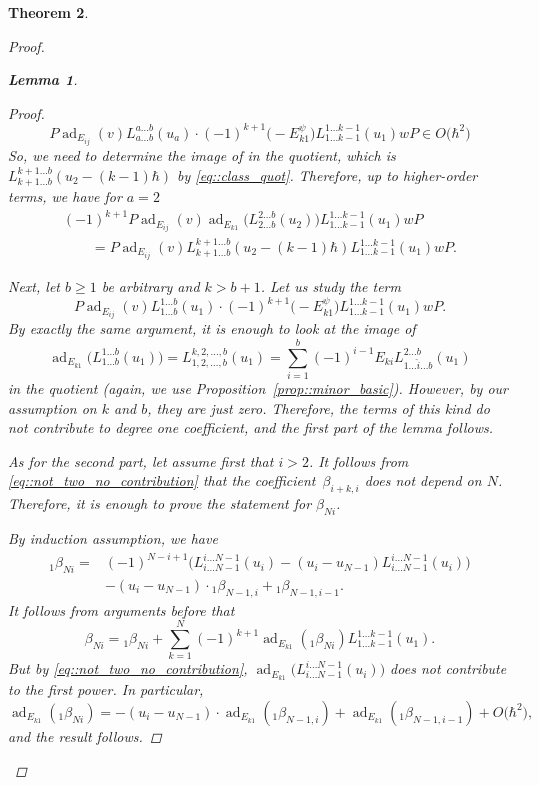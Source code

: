 \documentclass[10pt,a4paper]{article}
\numberwithin{equation}{section}
\newtheorem{Theorem}{Theorem}[section]
\newtheorem{Lemma}[Theorem]{Lemma}
\DeclareMathOperator{\ad}{ad}
\begin{document}
\begin{Theorem}
\begin{proof}
\begin{Lemma}
\begin{proof}
\begin{equation}
						P\ad_{E_{ij}}(v) L_{a\dots b}^{a\dots b}(u_a) \cdot (-1)^{k+1} \bigl(-E_{k1}^{\psi}\bigr) L_{1\dots k-1}^{1\dots k-1}(u_1) wP \in O\bigl(\hbar^2\bigr)
					\end{equation}
					So, we need to determine the image of  in the quotient, which is $L_{k+1\dots b}^{k+1\dots b}(u_2 - (k-1)\hbar)$ by \eqref{eq::class_quot}. Therefore, up to higher-order terms, we have for $a=2$
					\begin{gather*}
						(-1)^{k+1}P\ad_{E_{ij}}(v)\ad_{E_{k1}}\bigl(L_{2\dots b}^{2\dots b}(u_2)\bigr) L_{1\dots k-1}^{1\dots k-1}(u_1)w P \\
						\qquad=P\ad_{E_{ij}}(v) L_{k+1\dots b}^{k+1\dots b}(u_2-(k-1)\hbar) L_{1\dots k-1}^{1\dots k-1}(u_1) wP.
					\end{gather*}
					
					Next, let $b\geq 1$ be arbitrary and $k>b+1$. Let us study the term
					\[
					P\ad_{E_{ij}}(v) L_{1 \dots b}^{1\dots b}(u_1) \cdot (-1)^{k+1} \bigl(-E_{k1}^{\psi}\bigr) L_{1\dots k-1}^{1\dots k-1}(u_1) wP.
					\]
					By exactly the same argument, it is enough to look at the image of
					\[
					\ad_{E_{k1}}\bigl(L_{1\dots b}^{1\dots b}(u_1)\bigr) = L_{1,2,\dots,b}^{k,2,\dots,b}(u_1) = \sum\limits_{i=1}^b (-1)^{i-1} E_{ki} L_{1\dots \hat{i} \dots b}^{2\dots b}(u_1)
					\]
					in the quotient (again, we use Proposition~\ref{prop::minor_basic}). However, by our assumption on $k$ and $b$, they are just zero. Therefore, the terms of this kind do not contribute to degree one coefficient, and the first part of the lemma follows.
					
					As for the second part, let assume first that $i>2$. It follows from \eqref{eq::not_two_no_contribution} that the coefficient~$\beta_{i+k,i}$ does not depend on $N$. Therefore, it is enough to prove the statement for $\beta_{Ni}$.
					
					By induction assumption, we have
					\begin{align*}
							{}_1\beta_{Ni}
							={}&(-1)^{N-i+1}\bigl(L_{i\dots N-1}^{i\dots N-1}(u_i) - (u_i - u_{N-1}) L_{i \dots N-1}^{i \dots N-1}(u_i)\bigr)\\
&- (u_i - u_{N-1}) \cdot {}_1\beta_{N-1,i} + {}_1\beta_{N-1,i-1}.
					\end{align*}
					It follows from arguments before that
					\[
					\beta_{Ni} = {}_1 \beta_{Ni} + \sum\limits_{k=1}^{N}	(-1)^{k+1} \ad_{E_{k1}} ({}_1 \beta_{Ni}) L_{1\dots k-1}^{1\dots k-1}(u_1).
					\]
					But by \eqref{eq::not_two_no_contribution}, $\ad_{E_{k1}}\bigl(L_{i\dots N-1}^{i \dots N-1}(u_i)\bigr)$ does not contribute to the first power. In particular,
					\[
					\ad_{E_{k1}}({}_1 \beta_{Ni}) =- (u_i - u_{N-1})\cdot \ad_{E_{k1}}({}_1\beta_{N-1,i}) + \ad_{E_{k1}}({}_1\beta_{N-1,i-1}) + O\bigl(\hbar^2\bigr),
					\]
					and the result follows.
					

\end{proof}
\end{Lemma}
\end{proof}
\end{Theorem}
\end{document}
